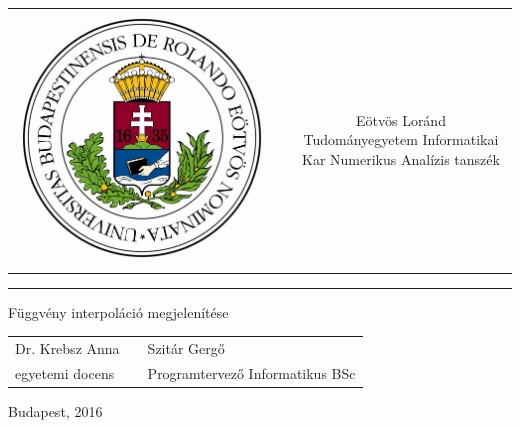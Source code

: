 \documentclass[12pt]{report}
\begin{document}
\begin{titlepage}
\vspace*{0cm}
\centering
\begin{tabular}{cp{2cm}c}
\begin{minipage}{4cm}
\vspace{0pt}
\includegraphics[width=1\textwidth]{pics/eltecimerszines}
\end{minipage} & &
\begin{minipage}{7cm}
\vspace{0pt}Eötvös Loránd Tudományegyetem \vspace{10pt} \newline
Informatikai Kar \vspace{10pt} \newline
Numerikus Analízis tanszék
\end{minipage}
\end{tabular}

\vspace*{0.2cm}
\rule{\textwidth}{1pt}

\vspace*{6cm}
{\Huge Függvény interpoláció megjelenítése}

\vspace*{5cm}
\begin{tabular}{lp{3cm}l}
Dr. Krebsz Anna  & &  Szitár Gergő \\
egyetemi docens & & Programtervező Informatikus BSc
\end{tabular}

\vfill

\vspace*{1cm}
Budapest, 2016
\end{titlepage}
\end{document}
